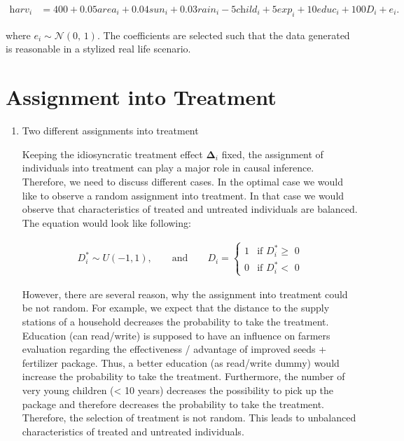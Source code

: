 \begin{align}
	\label{eq:eq4}
	\textit{harv}_i &= 400 + 0.05 \textit{area}_i + 0.04 \textit{sun}_i + 0.03 \textit{rain}_i - 5 \textit{child}_i + 5 \textit{exp}_i + 10 \textit{educ}_i + 100 \textit{D}_i + \textit{e}_i.
\end{align}

where $\textit{e}_i \sim \mathcal{N}(0,\,1)$. The coefficients are selected such that the data generated is reasonable in a stylized real life scenario. 


\section{Assignment into Treatment} \label{sec:assignment}

\begin{enumerate}
\item Two different assignments into treatment

Keeping the idiosyncratic treatment effect $\boldsymbol{\Delta}_i$ fixed, the assignment of individuals into treatment can play a major role in causal inference. Therefore, we need to discuss different cases. In the optimal case we would like to observe a random assignment into treatment. In that case we would observe that characteristics of treated and untreated individuals are balanced. The equation would look like following:

\begin{align}
	\label{eq:eq5}
	\textit{D}_i^\ast \sim U(-1, 1), 
	\qquad \text{and}  \qquad
 	\textit{D}_i =
    	\begin{cases}
      1 & \text{if $\textit{D}_i^\ast \geq$ 0}\\
      0 & \text{if $\textit{D}_i^\ast <$ 0}
    	\end{cases} 
\end{align}


However, there are several reason, why the assignment into treatment could be not random. For example, we expect that the distance to the supply stations of a household decreases the probability to take the treatment. Education (can read/write) is supposed to have an influence on farmers evaluation regarding the effectiveness / advantage of improved seeds + fertilizer package. Thus, a better education (as read/write dummy) would increase the probability to take the treatment. Furthermore, the number of very young children (< 10 years) decreases the possibility to pick up the package and therefore decreases the probability to take the treatment. Therefore, the selection of treatment is not random. This leads to unbalanced characteristics of treated and untreated individuals. 


\end{enumerate}
